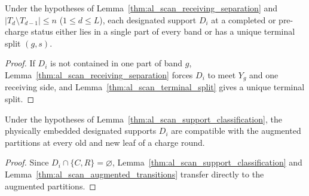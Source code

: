 \begin{lemma}
    \label{thm:al_scan_support_classification}
    \leanok
    Under the hypotheses of Lemma~\ref{thm:al_scan_receiving_separation} and
    $|T_d\setminus T_{d-1}|\le n$ ($1\le d\le L$), each designated support $D_i$
    at a completed or pre-charge status either lies in a single part of every
    band or has a unique terminal split $(g,s)$.
\end{lemma}
\begin{proof}\leanok
    If $D_i$ is not contained in one part of band $g$,
    Lemma~\ref{thm:al_scan_receiving_separation} forces $D_i$ to meet $Y_g$
    and one receiving side, and Lemma~\ref{thm:al_scan_terminal_split} gives
    a unique terminal split.
\end{proof}

\begin{lemma}
    \label{thm:al_scan_augmented_supports}
    \leanok
    Under the hypotheses of Lemma~\ref{thm:al_scan_support_classification},
    the physically embedded designated supports $D_i$ are compatible with the
    augmented partitions at every old and new leaf of a charge round.
\end{lemma}
\begin{proof}\leanok
    Since $D_i\cap\{C,R\}=\varnothing$, Lemma~\ref{thm:al_scan_support_classification}
    and Lemma~\ref{thm:al_scan_augmented_transitions} transfer directly to the
    augmented partitions.
\end{proof}

